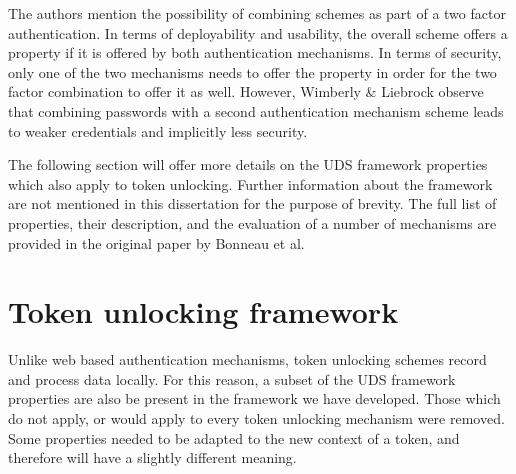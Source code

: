 The authors mention the possibility of combining schemes as part of a two factor authentication. In terms of deployability and usability, the overall scheme offers a property if it is offered by both authentication mechanisms. In terms of security, only one of the two mechanisms needs to offer the property in order for the two factor combination to offer it as well. However, Wimberly \& Liebrock \cite{wimberly2011using} observe that combining passwords with a second authentication mechanism scheme leads to weaker credentials and implicitly less security.

The following section will offer more details on the UDS framework properties which also apply to token unlocking. Further information about the framework are not mentioned in this dissertation for the purpose of brevity.  The full list of properties, their description, and the evaluation of a number of mechanisms are provided in the original paper by Bonneau et al. 

\section{Token unlocking framework}
Unlike web based authentication mechanisms, token unlocking schemes record and process data locally. For this reason, a subset of the UDS framework properties are also be present in the framework we have developed. Those which do not apply, or would apply to every token unlocking mechanism were removed. Some properties needed to be adapted to the new context of a token, and therefore will have a slightly different meaning.

